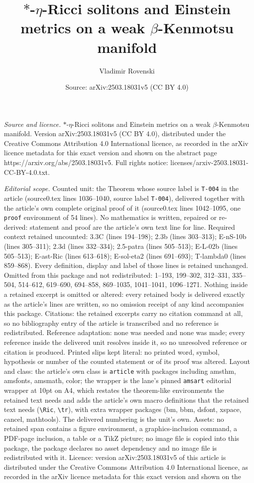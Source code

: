 \documentclass[10pt,a4paper]{amsart}
\title[$\ast$-$\eta$-Ricci solitons and Einstein metrics on a weak ]{$\ast$-$\eta$-Ricci solitons and Einstein metrics on a weak $\beta$-Kenmotsu manifold}
\author{Vladimir Rovenski}
\date{Source: arXiv:2503.18031v5 (CC BY 4.0)}
\begin{document}
\maketitle

\noindent\emph{Source and licence.} $\ast$-$\eta$-Ricci solitons and Einstein metrics on a weak $\beta$-Kenmotsu manifold. Version arXiv:2503.18031v5 (CC BY 4.0), distributed under the Creative Commons Attribution 4.0 International licence, as recorded in the arXiv licence metadata for this exact version and shown on the abstract page https://arxiv.org/abs/2503.18031v5. Full rights notice: licenses/arxiv-2503.18031-CC-BY-4.0.txt.\par\smallskip

\noindent\textit{Editorial scope.} Counted unit: the Theorem whose source label is \texttt{T-004} in the article (source0.tex lines 1036--1040, source label \texttt{T-004}), delivered together with the article's own complete original proof of it (source0.tex lines 1042--1095, one \texttt{proof} environment of 54 lines). No mathematics is written, repaired or re-derived: statement and proof are the article's own text line for line. Required context retained uncounted: 3.3C (lines 194--198); 2.3b (lines 303--313); E-nS-10b (lines 305--311); 2.3d (lines 332--334); 2.5-patra (lines 505--513); E-L-02b (lines 505--513); E-ast-Ric (lines 613--618); E-sol-eta2 (lines 691--693); T-lambda0 (lines 859--868). Every definition, display and label of those lines is retained unchanged. Omitted from this package and not redistributed: 1--193, 199--302, 312--331, 335--504, 514--612, 619--690, 694--858, 869--1035, 1041--1041, 1096--1271. Nothing inside a retained excerpt is omitted or altered: every retained body is delivered exactly as the article's lines are written, so no omission receipt of any kind accompanies this package. Citations: the retained excerpts carry no citation command at all, so no bibliography entry of the article is transcribed and no reference is redistributed. Reference adaptation: none was needed and none was made; every reference inside the delivered unit resolves inside it, so no unresolved reference or citation is produced. Printed slips kept literal: no printed word, symbol, hypothesis or number of the counted statement or of its proof was altered. Layout and class: the article's own class is \texttt{article} with packages including amsthm, amsfonts, amsmath, color; the wrapper is the lane's pinned \texttt{amsart} editorial wrapper at 10pt on A4, which restates the theorem-like environments the retained text needs and adds the article's own macro definitions that the retained text needs (\texttt{\textbackslash Ric}, \texttt{\textbackslash tr}), with extra wrapper packages (bm, bbm, dsfont, xspace, cancel, mathtools). The delivered numbering is the unit's own. Assets: no retained span contains a figure environment, a graphics-inclusion command, a PDF-page inclusion, a table or a TikZ picture; no image file is copied into this package, the package declares no asset dependency and no image file is redistributed with it. Licence: version arXiv:2503.18031v5 of this article is distributed under the Creative Commons Attribution 4.0 International licence, as recorded in the arXiv licence metadata for this exact version and shown on the 
\end{document}
